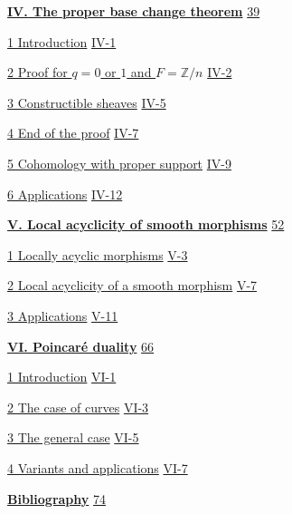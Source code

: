 \hyperref[I:4]{\textbf{IV. The proper base change theorem}}\dotfill
  \hyperref[I:4]{39}\par
\hspace*{1.5em}\hyperref[I:4-1]{1 Introduction}\dotfill
  \hyperref[I:4-1]{IV-1}\par
\hspace*{1.5em}\hyperref[I:4-2]{2 Proof for $q=0$ or $1$ and $F=\mathbb Z/n$}\dotfill
  \hyperref[I:4-2]{IV-2}\par
\hspace*{1.5em}\hyperref[I:4-3]{3 Constructible sheaves}\dotfill
  \hyperref[I:4-3]{IV-5}\par
\hspace*{1.5em}\hyperref[I:4-4]{4 End of the proof}\dotfill
  \hyperref[I:4-4]{IV-7}\par
\hspace*{1.5em}\hyperref[I:4-5]{5 Cohomology with proper support}\dotfill
  \hyperref[I:4-5]{IV-9}\par
\hspace*{1.5em}\hyperref[I:4-6]{6 Applications}\dotfill
  \hyperref[I:4-6]{IV-12}\par

\hyperref[I:5]{\textbf{V. Local acyclicity of smooth morphisms}}\dotfill
  \hyperref[I:5]{52}\par
\hspace*{1.5em}\hyperref[I:5-1]{1 Locally acyclic morphisms}\dotfill
  \hyperref[I:5-1]{V-3}\par
\hspace*{1.5em}\hyperref[I:5-2]{2 Local acyclicity of a smooth morphism}\dotfill
  \hyperref[I:5-2]{V-7}\par
\hspace*{1.5em}\hyperref[I:5-3]{3 Applications}\dotfill
  \hyperref[I:5-3]{V-11}\par

\hyperref[I:6]{\textbf{VI. Poincaré duality}}\dotfill
  \hyperref[I:6]{66}\par
\hspace*{1.5em}\hyperref[I:6-1]{1 Introduction}\dotfill
  \hyperref[I:6-1]{VI-1}\par
\hspace*{1.5em}\hyperref[I:6-2]{2 The case of curves}\dotfill
  \hyperref[I:6-2]{VI-3}\par
\hspace*{1.5em}\hyperref[I:6-3]{3 The general case}\dotfill
  \hyperref[I:6-3]{VI-5}\par
\hspace*{1.5em}\hyperref[I:6-4]{4 Variants and applications}\dotfill
  \hyperref[I:6-4]{VI-7}\par

\hyperref[I:bib]{\textbf{Bibliography}}\dotfill
  \hyperref[I:bib]{74}\par
\endgroup

\newpage
